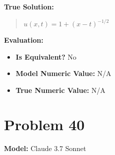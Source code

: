 \documentclass{article}
\begin{document}
\textbf{True Solution:}
\begin{quote}
$u(x,t) = 1 + (x-t)^{-1/2}$
\end{quote}

\textbf{Evaluation:}
\begin{itemize}
\item \textbf{Is Equivalent?} No
\item \textbf{Model Numeric Value:} N/A
\item \textbf{True Numeric Value:} N/A
\end{itemize}
\vspace{1cm}
\section*{Problem 40}
\textbf{Model:} Claude 3.7 Sonnet
\end{document}
